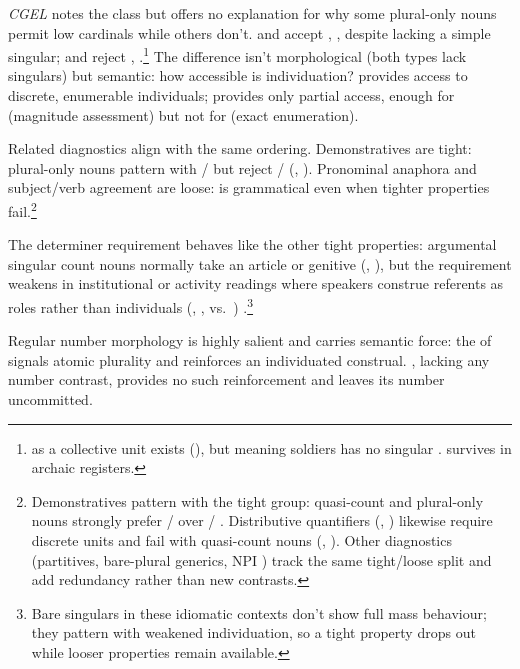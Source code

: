 \documentclass[12pt,a4paper]{article}
\begin{document}
\textit{CGEL} notes the class but offers no explanation for why some plural-only nouns permit low cardinals while others don't.  and  accept , , despite lacking a simple singular;  and  reject ,  \citep[p.~345]{huddleston2002}.\footnote{ as a collective unit exists (), but  meaning soldiers has no singular .  survives in archaic registers.} The difference isn't morphological (both types lack singulars) but semantic: how accessible is individuation?  provides access to discrete, enumerable individuals;  provides only partial access, enough for  (magnitude assessment) but not for  (exact enumeration).

Related diagnostics align with the same ordering. Demonstratives are tight: plural-only nouns pattern with / but reject / (, ). Pronominal anaphora and subject/verb agreement are loose:  is grammatical even when tighter properties fail.\footnote{Demonstratives pattern with the tight group: quasi-count and plural-only nouns strongly prefer / over / \citep[p.~356]{huddleston2002}. Distributive quantifiers (, ) likewise require discrete units and fail with quasi-count nouns (, ). Other diagnostics (partitives, bare-plural generics, NPI ) track the same tight/loose split and add redundancy rather than new contrasts.}

The determiner requirement behaves like the other tight properties: argumental singular count nouns normally take an article or genitive (, ), but the requirement weakens in institutional or activity readings where speakers construe referents as roles rather than individuals (, ,  vs.\ ) \citep[pp.~409--410]{huddleston2002}.\footnote{Bare singulars in these idiomatic contexts don't show full mass behaviour; they pattern with weakened individuation, so a tight property drops out while looser properties remain available.}

Regular number morphology is highly salient and carries semantic force: the  of  signals atomic plurality and reinforces an individuated construal. , lacking any number contrast, provides no such reinforcement and leaves its number uncommitted.
\end{document}
